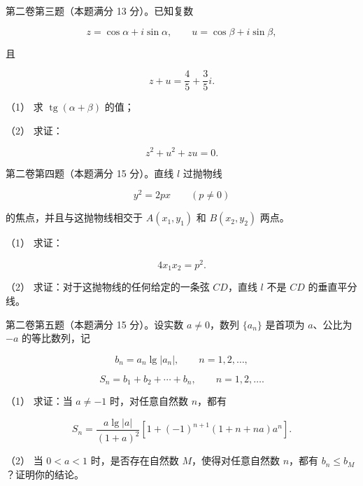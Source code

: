 \begin{question}

第二卷第三题（本题满分 13 分）。已知复数

\nopagebreak[4]
\[
z=\cos\alpha+i\sin\alpha,\qquad
u=\cos\beta+i\sin\beta,
\]

且

\nopagebreak[4]
\[
z+u=\frac45+\frac35i.
\]

（1） 求 $\operatorname{tg}(\alpha+\beta)$ 的值；

（2） 求证：

\nopagebreak[4]
\[
z^2+u^2+zu=0.
\]

\end{question}
\begin{question}

第二卷第四题（本题满分 15 分）。直线 $l$ 过抛物线

\nopagebreak[4]
\[
y^2=2px\qquad(p\ne0)
\]

的焦点，并且与这抛物线相交于 $A(x_1,y_1)$ 和 $B(x_2,y_2)$ 两点。

（1） 求证：

\nopagebreak[4]
\[
4x_1x_2=p^2.
\]

（2） 求证：对于这抛物线的任何给定的一条弦 $CD$，直线 $l$ 不是 $CD$ 的垂直平分线。

\end{question}
\begin{question}

第二卷第五题（本题满分 15 分）。设实数 $a\ne0$，数列 $\{a_n\}$ 是首项为 $a$、公比为 $-a$ 的等比数列，记

\nopagebreak[4]
\[
b_n=a_n\lg|a_n|,\qquad n=1,2,\ldots,
\]

\nopagebreak[4]
\[
S_n=b_1+b_2+\cdots+b_n,\qquad n=1,2,\ldots.
\]

（1） 求证：当 $a\ne-1$ 时，对任意自然数 $n$，都有

\nopagebreak[4]
\[
S_n=\frac{a\lg|a|}{(1+a)^2}
\left[1+(-1)^{n+1}(1+n+na)a^n\right].
\]

（2） 当 $0<a<1$ 时，是否存在自然数 $M$，使得对任意自然数 $n$，都有 $b_n\leq b_M$？证明你的结论。

\end{question}